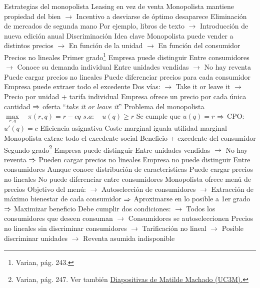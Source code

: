 \documentclass{nuevotema}
\begin{document}
\begin{esquemal}
			\3 Estrategias del monopolista
				\4 Leasing en vez de venta
				\4[] Monopolista mantiene propiedad del bien
				\4[] $\to$ Incentivo a desviarse de óptimo desaparece
				\4 Eliminación de mercados de segunda mano
				\4[] Por ejemplo, libros de texto
				\4[] $\to$ Introducción de nueva edición anual
		\2 Discriminación
			\3 Idea clave
				\4 Monopolista puede vender a distintos precios
				\4[] $\to$ En función de la unidad
				\4[] $\to$ En función del consumidor
				\4[$\then$] Precios no lineales
			\3 Primer grado\footnote{Varian, pág. 243.}
				\4 Empresa puede distinguir
				\4[] Entre consumidores
				\4[] $\to$ Conoce su demanda individual
				\4[] Entre unidades vendidas
				\4[] $\to$ No hay reventa
				\4[$\then$] Puede cargar precios no lineales
				\4[$\then$] Puede diferenciar precios para cada consumidor
				\4 Empresa puede extraer todo el excedente
				\4[] Dos vías:
				\4[] $\to$ Take it or leave it
				\4[] $\to$ Precio por unidad + tarifa individual
				\4 Empresa ofrece un precio por cada única cantidad
				\4[] $\then$ oferta ``\textit{take it or leave it}''
				\4 Problema del monopolista
				\4[] $\underset{r,q}{\max} \quad \pi(r,q) = r - cq$
				\4[] $s.a: \quad u(q) \geq r$
				\4 Se cumple que $u(q) = r$
				\4[] $\then$ CPO: $u'(q) = c$
				\4 Eficiencia asignativa
				\4[] Coste marginal iguala utilidad marginal
				\4 Monopolista extrae todo el excedente social
				\4[] Beneficio + excedente del consumidor
			\3 Segundo grado\footnote{Varian, pág. 247. Ver también \href{http://www.eco.uc3m.es/~mmachado/Teaching/OI-I-MEI/slides/2.2.PriceDiscrimination_short.pdf}{Diapositivas de Matilde Machado (UC3M).}}
				\4 Empresa puede distinguir
				\4[] Entre unidades vendidas
				\4[] $\to$ No hay reventa
				\4[] $\then$ Pueden cargar precios no lineales
				\4 Empresa no puede distinguir
				\4[] Entre consumidores
				\4[] Aunque conoce distribución de características
				\4[$\then$] Puede cargar precios no lineales
				\4[$\then$] No puede diferenciar entre consumidores
				\4 Monopolista ofrece menú de precios
				\4[] Objetivo del menú:
				\4[] $\to$ Autoselección de consumidores
				\4[] $\to$ Extracción de máximo bienestar de cada consumidor
				\4[] $\then$ Aproximarse en lo posible a 1er grado
				\4[] $\then$ Maximizar beneficio
				\4[] Debe cumplir dos condiciones:
				\4[] $\to$ Todos los consumidores que deseen consuman
				\4[] $\to$ Consumidores se autoseleccionen
				\4 Precios no lineales sin discriminar consumidores
				\4[] $\to$ Tarificación no lineal
				\4[] $\to$ Posible discriminar unidades
				\4[] $\to$ Reventa asumida indisponible

\end{esquemal}
\end{document}
